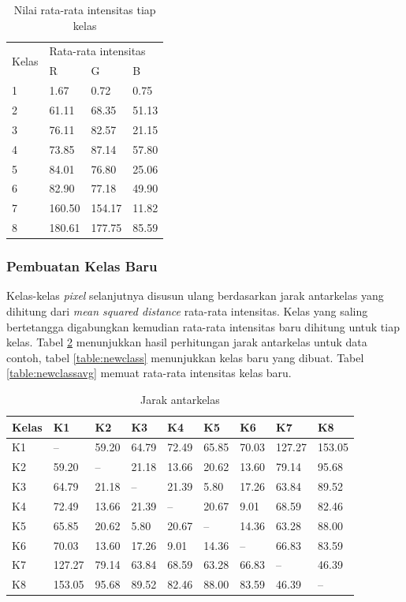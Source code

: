 \documentclass[laporan.tex]{subfiles}
\begin{document}
\begin{table}[h]
\centering
\begin{tabular}{|l|l|l|l|}
\cline{1-4}
\multirow{2}{*}{Kelas} & \multicolumn{3}{l|}{Rata-rata intensitas} \\
\cline{2-4}
 & R & G & B \\
\cline{1-4}
1 & 1.67 & 0.72 & 0.75 \\
2 & 61.11 & 68.35 & 51.13 \\
3 & 76.11 & 82.57 & 21.15 \\
4 & 73.85 & 87.14 & 57.80 \\
5 & 84.01 & 76.80 & 25.06 \\
6 & 82.90 & 77.18 & 49.90 \\
7 & 160.50 & 154.17 & 11.82 \\
8 & 180.61 & 177.75 & 85.59 \\
\cline{1-4}
\end{tabular}
\caption{Nilai rata-rata intensitas tiap kelas}
\label{table:clsrgbavg1}
\end{table}

\subsubsection{Pembuatan Kelas Baru}

Kelas-kelas \emph{pixel} selanjutnya disusun ulang berdasarkan jarak antarkelas yang dihitung dari \emph{mean squared distance} rata-rata intensitas. Kelas yang saling bertetangga digabungkan kemudian rata-rata intensitas baru dihitung untuk tiap kelas. Tabel \ref{table:clsdist} menunjukkan hasil perhitungan jarak antarkelas untuk data contoh, tabel \ref{table:newclass} menunjukkan kelas baru yang dibuat. Tabel \ref{table:newclassavg} memuat rata-rata intensitas kelas baru.


\begin{table}[h]
\centering
\begin{tabular}{|l|l|l|l|l|l|l|l|l|}
\hline
Kelas & K1 & K2 & K3 & K4 & K5 & K6 & K7 & K8 \\
\hline
K1 & -- & 59.20 & 64.79 & 72.49 & 65.85 & 70.03 & 127.27 & 153.05 \\
K2 & 59.20 & -- & 21.18 & 13.66 & 20.62 & 13.60 & 79.14 & 95.68 \\
K3 & 64.79 & 21.18 & --	& 21.39 & 5.80 & 17.26 & 63.84 & 89.52 \\
K4 & 72.49 & 13.66 & 21.39 & --	& 20.67 & 9.01 & 68.59 & 82.46 \\
K5 & 65.85 & 20.62 & 5.80 & 20.67 & -- & 14.36 & 63.28 & 88.00 \\
K6 & 70.03 & 13.60 & 17.26 & 9.01 & 14.36 & -- & 66.83 & 83.59 \\
K7 & 127.27 & 79.14 & 63.84 & 68.59 & 63.28 & 66.83 & -- & 46.39 \\
K8 & 153.05 & 95.68 & 89.52 & 82.46 & 88.00 & 83.59 & 46.39 & -- \\
\hline
\end{tabular}
\caption{Jarak antarkelas}
\label{table:clsdist}
\end{table}
\end{document}
